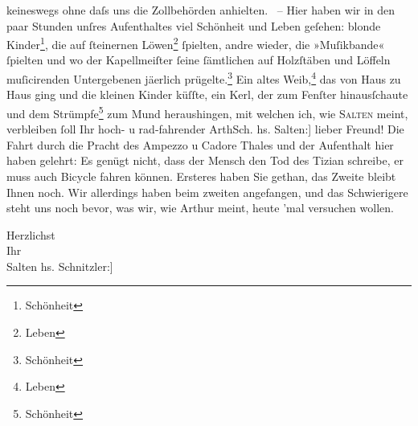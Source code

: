                keineswegs ohne daſs uns die Zollbehörden anhielten.  – Hier haben wir in den paar
               Stunden unſres Aufenthaltes viel Schönheit und Leben geſehen: blonde Kinder\footnote{\noindent{}Schönheit}, die auf{ }ſteinernen Löwen\footnote{\noindent{}Leben}{ }ſpielten, andre wieder, die »Muſikbande«{ }ſpielten
               und wo der Kapellmeiſter{ }ſeine{ }ſämtlichen auf {\pb}Holzſtäben
               und Löffeln muſicirenden Untergebenen jä{\geminationm}erlich
                  prügelte.\footnote{\noindent{}Schönheit} Ein altes Weib,\footnote{\noindent{}Leben} das von Haus zu Haus ging und die kleinen Kinder küſſte, ein Kerl, der zum
               Fenſter hinausſchaute und dem Strümpfe\footnote{\noindent{}Schönheit} zum Mund heraushingen, mit welchen ich, wie \textsc{Salten} meint, verbleiben{ }ſoll\pend
           \pstart Ihr hoch- u rad-fahrender \spacefill\mbox{ArthSch.}\pend{}\vspace{1em}
\pstart
           \noindent{}{\pb}{[}hs. Salten:{]} lieber Freund! Die Fahrt durch die Pracht des Ampezzo u Cadore Thales
               und der Aufenthalt hier haben gelehrt: Es genügt nicht, dass der Mensch den Tod des Tizian schreibe, er muss auch Bicycle
               fahren können. Ersteres haben Sie gethan, das Zweite bleibt Ihnen noch. Wir
               allerdings haben beim zweiten angefangen, und das Schwierigere steht uns noch bevor,
               was wir, wie Arthur meint, heute ’mal versuchen wollen.\pend
           
\pstart
           Herzlichst{\\}Ihr{\\}\spacefill\mbox{Salten}\pend
           \vspace{1em}
\pstart
           \noindent{}{[}hs. Schnitzler:{]} \label{T_L00259-1v}\label{T_L00259-1}\pend
           
